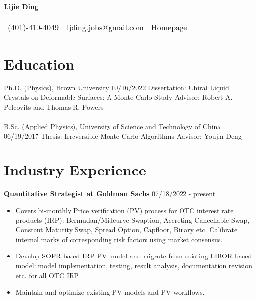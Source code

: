 \documentclass[11pt,letterpaper]{article}
\begin{document}
\pagestyle{headings}

\begin{center}
    \Large{\textbf{Lijie Ding}} \\
\end{center}
\begin{center}
    \begin{tabular}{l l l l}
        (401)-410-4049 & ljding.jobs@gmail.com & \href{https://ljding94.github.io}{Homepage}
    \end{tabular}
\end{center}


\section*{Education}
\vspace*{-0.1in}
Ph.D. (Physics), Brown University \hfill 10/16/2022 \newline
Dissertation: Chiral Liquid Crystals on Deformable Surfaces: A Monte Carlo Study \newline
Advisor: Robert A. Pelcovits and Thomas R. Powers
\vspace*{-0.05in}
\\~\\
B.Sc. (Applied Physics), University of Science and Technology of China \hfill 06/19/2017\newline
Thesis: Irreversible Monte Carlo Algorithms \newline
Advisor: Youjin Deng


\section*{Industry Experience}
\vspace*{-0.05in}
\textbf{Quantitative Strategist at Goldman Sachs} \hfill 07/18/2022 - present
\vspace*{-0.05in}
\begin{itemize}
    \item Covers bi-monthly Price verification (PV) process for OTC interest rate products (IRP): Bermudan/Midcurve Swaption, Accreting Cancellable Swap, Constant Maturity Swap, Spread Option, Capfloor, Binary etc. Calibrate internal marks of corresponding risk factors using market consensus.
    \item Develop SOFR based IRP PV model and migrate from existing LIBOR based model: model implementation, testing, result analysis, documentation revision etc. for all OTC IRP.
    \item Maintain and optimize existing PV models and PV workflows.
\end{itemize}
\end{document}
